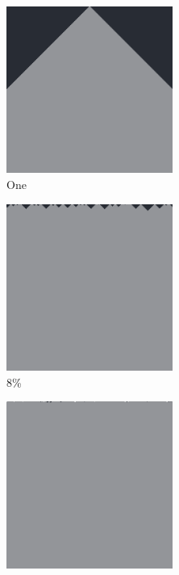 \documentclass[12pt, fleqn]{report}                             %
\theoremstyle{break}                                            %
\begin{document}
      \begin{figure}[ht!]
        \centering
        \begin{subfigure}[b]{0.4\linewidth}
          \includegraphics[width=0.6\textwidth]{Images/178/a.png}
          \caption{One}
        \end{subfigure}
        \begin{subfigure}[b]{0.4\linewidth}
          \includegraphics[width=0.6\textwidth]{Images/178/b.png}
          \caption{8\%}
        \end{subfigure}
        \begin{subfigure}[b]{0.4\linewidth}
          \includegraphics[width=0.6\textwidth]{Images/178/c.png}

\end{subfigure}
\end{figure}
\end{document}
